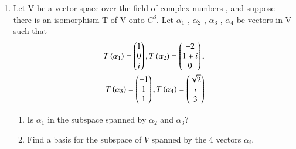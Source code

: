 \renewcommand{\theequation}{\theenumi}
\renewcommand{\thefigure}{\theenumi}
\begin{enumerate}[label=\thesubsection.\arabic*.,ref=\thesubsection.\theenumi]
%
\item Let V be a vector space over the field of complex numbers , and suppose there is an isomorphism T of V onto $C^{3}$. Let $\alpha_1$ , $\alpha_2$ , $\alpha_3$  , $\alpha_4$ be vectors in V such that 
   \begin{multline}
    \begin{aligned}
    T\left(\alpha_1\right)=\begin{pmatrix}1\\0\\i\end{pmatrix} , T\left(\alpha_2\right)=\begin{pmatrix}-2\\1+i\\0\end{pmatrix} ,\\ T\left(\alpha_3\right)=\begin{pmatrix}-1\\1\\1\end{pmatrix} , T\left(\alpha_4\right)=\begin{pmatrix}\sqrt{2}\\i\\3\end{pmatrix}
    \end{aligned}
    \end{multline}
\begin{enumerate}
\item     Is $\alpha_1$ in the subspace spanned by $\alpha_2$ and $\alpha_3$?
\\
%
\solution

\item Find a basis for the subspace of $V$ spanned by the 4 vectors $\alpha_i$.
%
%
%
\\

\end{enumerate}
\end{enumerate}
